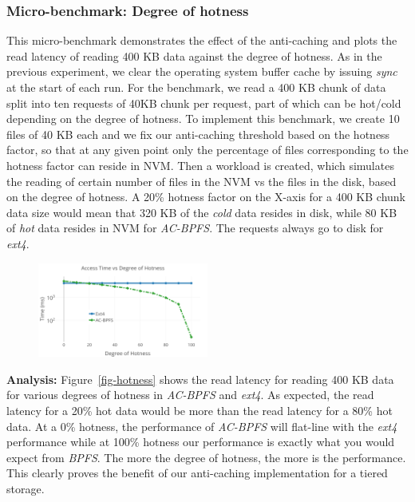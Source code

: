 \subsubsection{Micro-benchmark: Degree of hotness}
This micro-benchmark demonstrates the effect of the anti-caching and plots the read latency of reading 400 KB data against the degree of hotness. As in the previous experiment, we clear the operating system buffer cache by issuing \textit{sync} at the start of each run. For the benchmark, we read a 400 KB chunk of data split into ten requests of 40KB chunk per request, part of which can be hot/cold depending on the degree of hotness. To implement this benchmark, we create 10 files of 40 KB each and we fix our anti-caching threshold based on the hotness factor, so that at any given point only the percentage of files corresponding to the hotness factor can reside in NVM. Then a workload is created, which simulates the reading of certain number of files in the NVM vs the files in the disk, based on the degree of hotness. A 20\% hotness factor on the X-axis for a 400 KB chunk data size would mean that 320 KB of the \textit{cold} data resides in disk, while 80 KB of \textit{hot} data resides in NVM for \textit{AC-BPFS}. The requests always go to disk for \textit{ext4}.   

\begin{figure}
\centering
\includegraphics[width=0.5\textwidth]{figs/hotness.png}
\end{figure}

\textbf{Analysis:} Figure~\ref{fig-hotness} shows the read latency for reading 400 KB data for various degrees of hotness in \textit{AC-BPFS} and \textit{ext4}. As expected, the read latency for a 20\% hot data would be more than the read latency for a 80\% hot data. At a 0\% hotness, the performance of \textit{AC-BPFS} will flat-line with the \textit{ext4} performance while at 100\% hotness our performance is exactly what you would expect from \textit{BPFS}. The more the degree of hotness, the more is the performance. This clearly proves the benefit of our anti-caching implementation for a tiered storage.

